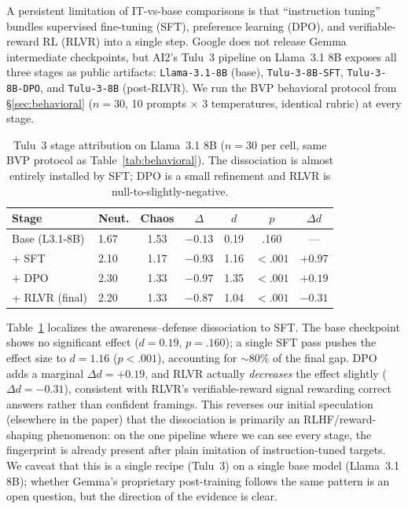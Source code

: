 \documentclass[10pt,twocolumn]{article}
\begin{document}
A persistent limitation of IT-vs-base comparisons is that ``instruction tuning'' bundles supervised fine-tuning (SFT), preference learning (DPO), and verifiable-reward RL (RLVR) into a single step.
Google does not release Gemma intermediate checkpoints, but AI2's Tulu~3 pipeline \citep{lambert2024tulu3} on Llama~3.1 8B exposes all three stages as public artifacts: \texttt{Llama-3.1-8B} (base), \texttt{Tulu-3-8B-SFT}, \texttt{Tulu-3-8B-DPO}, and \texttt{Tulu-3-8B} (post-RLVR).
We run the BVP behavioral protocol from \S\ref{sec:behavioral} ($n=30$, 10 prompts $\times$ 3 temperatures, identical rubric) at every stage.

\begin{table}[t]
\centering
\caption{Tulu~3 stage attribution on Llama~3.1 8B ($n = 30$ per cell, same BVP protocol as Table~\ref{tab:behavioral}). The dissociation is almost entirely installed by SFT; DPO is a small refinement and RLVR is null-to-slightly-negative.}
\label{tab:tulu3}
\small
\begin{tabular}{@{}llccccc@{}}
\toprule
\textbf{Stage} & \textbf{Neut.} & \textbf{Chaos} & \textbf{$\Delta$} & $d$ & $p$ & $\Delta d$ \\
\midrule
Base (L3.1-8B) & 1.67 & 1.53 & $-0.13$ & 0.19 & .160 & --- \\
+ SFT          & 2.10 & 1.17 & $-0.93$ & 1.16 & $<.001$ & $+0.97$ \\
+ DPO          & 2.30 & 1.33 & $-0.97$ & 1.35 & $<.001$ & $+0.19$ \\
+ RLVR (final) & 2.20 & 1.33 & $-0.87$ & 1.04 & $<.001$ & $-0.31$ \\
\bottomrule
\end{tabular}
\end{table}

Table~\ref{tab:tulu3} localizes the awareness--defense dissociation to SFT.
The base checkpoint shows no significant effect ($d = 0.19$, $p = .160$); a single SFT pass pushes the effect size to $d = 1.16$ ($p < .001$), accounting for $\sim$80\% of the final gap.
DPO adds a marginal $\Delta d = +0.19$, and RLVR actually \emph{decreases} the effect slightly ($\Delta d = -0.31$), consistent with RLVR's verifiable-reward signal rewarding correct answers rather than confident framings.
This reverses our initial speculation (elsewhere in the paper) that the dissociation is primarily an RLHF/reward-shaping phenomenon: on the one pipeline where we can see every stage, the fingerprint is already present after plain imitation of instruction-tuned targets.
We caveat that this is a single recipe (Tulu~3) on a single base model (Llama~3.1 8B); whether Gemma's proprietary post-training follows the same pattern is an open question, but the direction of the evidence is clear.
\end{document}
